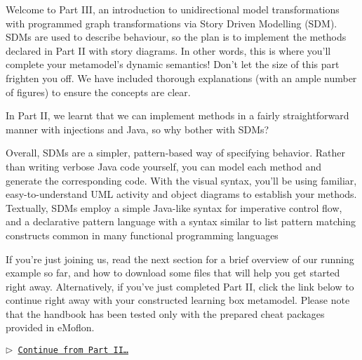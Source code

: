 \genHeader


\downloadLocation{\dlPartThree}

Welcome to Part III, an introduction to unidirectional model transformations with programmed graph transformations via Story Driven Modelling (SDM).
SDMs are used to describe behaviour, so the plan is to implement the methods declared in Part II with story diagrams. In other words,
this is where you'll complete your metamodel's dynamic semantics! Don't let the 
size of this part frighten you off. We have included thorough
explanations (with an ample number of figures) to ensure the concepts are 
clear.

In Part II, we learnt that we can implement methods in a fairly straightforward manner with injections and Java, so why bother with SDMs?

Overall, SDMs are a simpler, pattern-based way of specifying behavior. Rather than writing verbose Java code yourself, you can model each method and generate
the corresponding code. With the visual syntax, you'll be using familiar, easy-to-understand UML activity and object diagrams to establish your methods.
Textually, SDMs employ a simple Java-like syntax for imperative control flow, and a declarative pattern language with a syntax similar to list pattern matching
constructs common in many functional programming languages

If you're just joining us, read the next section for a brief overview of our running example so far, and how to download some files that will help you get
started right away. Alternatively, if you've just completed Part II, click the link below to continue right away with your constructed learning box metamodel. Please note that the handbook has been tested only with the prepared cheat packages provided in eMoflon.


\begin{center}\texttt{$\triangleright$ \hyperlink{explanation}{Continue from Part II\ldots}}\end{center}
